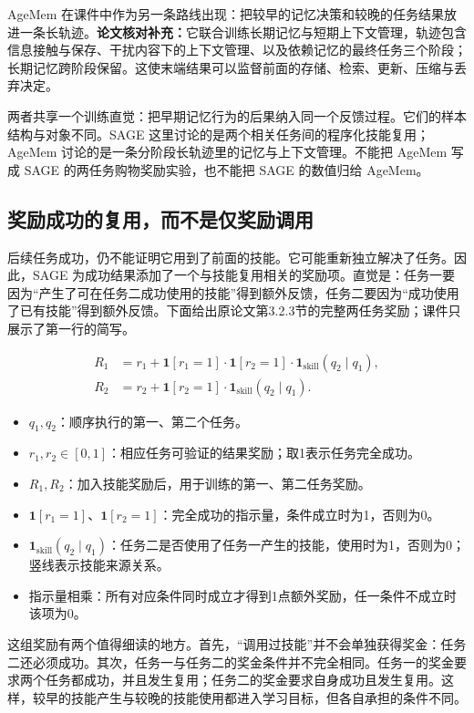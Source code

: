 \documentclass[11pt,a4paper]{article}
\begin{document}
AgeMem 在课件中作为另一条路线出现：把较早的记忆决策和较晚的任务结果放进一条长轨迹。\textbf{论文核对补充：}它联合训练长期记忆与短期上下文管理，轨迹包含信息接触与保存、干扰内容下的上下文管理、以及依赖记忆的最终任务三个阶段；长期记忆跨阶段保留。这使末端结果可以监督前面的存储、检索、更新、压缩与丢弃决定。

两者共享一个训练直觉：把早期记忆行为的后果纳入同一个反馈过程。它们的样本结构与对象不同。SAGE 这里讨论的是两个相关任务间的程序化技能复用；AgeMem 讨论的是一条分阶段长轨迹里的记忆与上下文管理。不能把 AgeMem 写成 SAGE 的两任务购物奖励实验，也不能把 SAGE 的数值归给 AgeMem。

\subsection{奖励成功的复用，而不是仅奖励调用}

后续任务成功，仍不能证明它用到了前面的技能。它可能重新独立解决了任务。因此，SAGE 为成功结果添加了一个与技能复用相关的奖励项。直觉是：任务一要因为“产生了可在任务二成功使用的技能”得到额外反馈，任务二要因为“成功使用了已有技能”得到额外反馈。下面给出原论文第3.2.3节的完整两任务奖励；课件只展示了第一行的简写。

$$
\begin{aligned}
R_1 &= r_1+\mathbf{1}[r_1=1]\cdot\mathbf{1}[r_2=1]\cdot\mathbf{1}_{\mathrm{skill}}(q_2\mid q_1),\\
R_2 &= r_2+\mathbf{1}[r_2=1]\cdot\mathbf{1}_{\mathrm{skill}}(q_2\mid q_1).
\end{aligned}
$$
\begin{itemize}
\item $q_1,q_2$：顺序执行的第一、第二个任务。
\item $r_1,r_2\in[0,1]$：相应任务可验证的结果奖励；取1表示任务完全成功。
\item $R_1,R_2$：加入技能奖励后，用于训练的第一、第二任务奖励。
\item $\mathbf{1}[r_1=1]$、$\mathbf{1}[r_2=1]$：完全成功的指示量，条件成立时为1，否则为0。
\item $\mathbf{1}_{\mathrm{skill}}(q_2\mid q_1)$：任务二是否使用了任务一产生的技能，使用时为1，否则为0；竖线表示技能来源关系。
\item 指示量相乘：所有对应条件同时成立才得到1点额外奖励，任一条件不成立时该项为0。
\end{itemize}

这组奖励有两个值得细读的地方。首先，“调用过技能”并不会单独获得奖金：任务二还必须成功。其次，任务一与任务二的奖金条件并不完全相同。任务一的奖金要求两个任务都成功，并且发生复用；任务二的奖金要求自身成功且发生复用。这样，较早的技能产生与较晚的技能使用都进入学习目标，但各自承担的条件不同。
\end{document}
